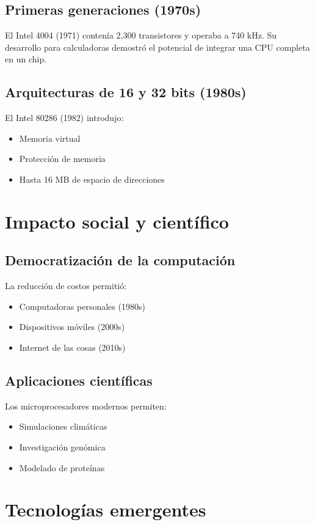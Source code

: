 \documentclass[]{article}
\begin{document}
\subsection{Primeras generaciones (1970s)}
El Intel 4004 (1971) contenía 2,300 transistores y operaba a 740 kHz. Su desarrollo para calculadoras demostró el potencial de integrar una CPU completa en un chip\cite{Steve_Jobs}.

\subsection{Arquitecturas de 16 y 32 bits (1980s)}
El Intel 80286 (1982) introdujo:
\begin{itemize}
\item Memoria virtual
\item Protección de memoria
\item Hasta 16 MB de espacio de direcciones
\end{itemize}

\section{Impacto social y científico}

\subsection{Democratización de la computación}
La reducción de costos permitió:
\begin{itemize}
\item Computadoras personales (1980s)
\item Dispositivos móviles (2000s)
\item Internet de las cosas (2010s)
\end{itemize}

\subsection{Aplicaciones científicas}
Los microprocesadores modernos permiten:
\begin{itemize}
\item Simulaciones climáticas
\item Investigación genómica
\item Modelado de proteínas
\end{itemize}

\section{Tecnologías emergentes}
\end{document}

